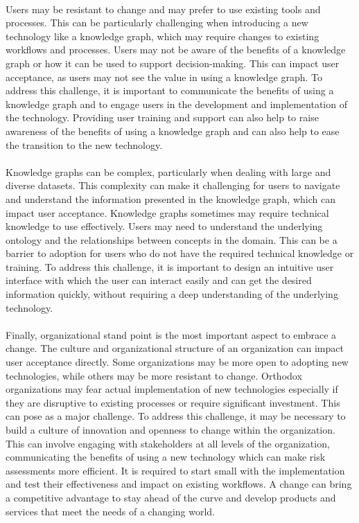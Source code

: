 \paragraph{} Users may be resistant to change and may prefer to use existing tools and processes. This can be particularly challenging when introducing a new technology like a knowledge graph, which may require changes to existing workflows and processes. Users may not be aware of the benefits of a knowledge graph or how it can be used to support decision-making. This can impact user acceptance, as users may not see the value in using a knowledge graph. To address this challenge, it is important to communicate the benefits of using a knowledge graph and to engage users in the development and implementation of the technology. Providing user training and support can also help to raise awareness of the benefits of using a knowledge graph and can also help to ease the transition to the new technology.

\paragraph{} Knowledge graphs can be complex, particularly when dealing with large and diverse datasets. This complexity can make it challenging for users to navigate and understand the information presented in the knowledge graph, which can impact user acceptance. Knowledge graphs sometimes may require technical knowledge to use effectively. Users may need to understand the underlying ontology and the relationships between concepts in the domain. This can be a barrier to adoption for users who do not have the required technical knowledge or training. To address this challenge, it is important to design an intuitive user interface with which the user can interact easily and can get the desired information quickly, without requiring a deep understanding of the underlying technology. 

\paragraph{} Finally, organizational stand point is the most important aspect to embrace a change. The culture and organizational structure of an organization can impact user acceptance directly. Some organizations may be more open to adopting new technologies, while others may be more resistant to change. Orthodox organizations may fear actual implementation of new technologies especially if they are disruptive to existing processes or require significant investment. This can pose as a major challenge. To address this challenge, it may be necessary to build a culture of innovation and openness to change within the organization. This can involve engaging with stakeholders at all levels of the organization, communicating the benefits of using a new technology which can make risk assessments more efficient. It is required to start small with the implementation and test their effectiveness and impact on existing workflows. A change can bring a competitive advantage to stay ahead of the curve and develop products and services that meet the needs of a changing world. 